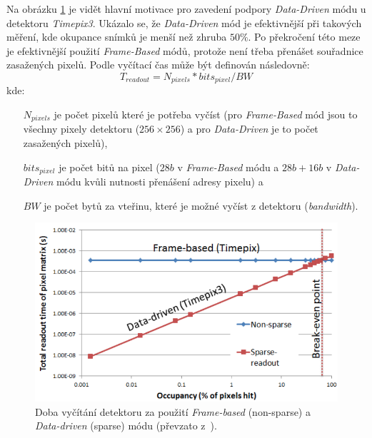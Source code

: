 Na obrázku \ref{fig:det:frame_vs_event_driven} je vidět hlavní motivace pro zavedení podpory \textit{Data-Driven} módu u detektoru \textit{Timepix3}. Ukázalo se, že \textit{Data-Driven} mód je efektivnější při takových měření, kde okupance snímků je menší než zhruba $50\%$. Po překročení této meze je efektivnější použití \textit{Frame-Based} módů, protože není třeba přenášet souřadnice zasažených pixelů. Podle \cite{timepix3} vyčítací čas může být definován následovně:
\begin{equation}\label{eq:det:readout_time}
	T_{readout} = N_{pixels}*bits_{pixel}/BW
\end{equation}
kde:
\begin{changemargin}{1.5cm}{1cm} 
	\begin{itemize}
		\item[$N_{pixels}$] je počet pixelů které je potřeba vyčíst (pro \textit{Frame-Based} mód jsou to všechny pixely detektoru ($256\times256$) a pro \textit{Data-Driven} je to počet zasažených pixelů),
		\item[$bits_{pixel}$] je počet bitů na pixel ($28 b$ v \textit{Frame-Based} módu a $28b + 16b$ v \textit{Data-Driven} módu kvůli nutnosti přenášení adresy pixelu) a
		\item[$BW$] je počet bytů za vteřinu, které je možné vyčíst z detektoru (\textit{bandwidth}). 
	\end{itemize}
\end{changemargin}

\begin{figure}[th]
	\begin{center}
		\includegraphics[width=14cm]{figures/det_frame_vs_event_driven.png}
		\caption{Doba vyčítání detektoru za použití \textit{Frame-based} (non-sparse) a \textit{Data-driven} (sparse) módu (převzato z~\cite{timepix3}).}
		\label{fig:det:frame_vs_event_driven}
	\end{center}
\end{figure}

